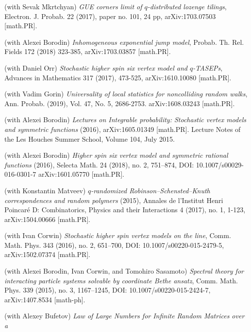 \documentclass[letterpaper,11pt]{article}
\begin{document}
\begin{etaremune}
	\item
	      (with Sevak Mkrtchyan)
	      \emph{GUE corners limit of $q$-distributed lozenge tilings},
				Electron. J. Probab. 22 (2017), paper no. 101, 24 pp,
				arXiv:1703.07503 [math.PR].
	\item
	      (with Alexei Borodin)
	      \emph{Inhomogeneous exponential jump model},
				Probab. Th. Rel. Fields
				172 (2018) 323-385,
				arXiv:1703.03857 [math.PR].
	\item
	      (with Daniel Orr)
	      \emph{Stochastic higher spin six vertex model and $q$-TASEPs},
	      Advances in Mathematics 317 (2017), 473-525, arXiv:1610.10080
	      [math.PR].
			\item
	      (with Vadim Gorin)
	      \emph{Universality of local statistics for noncolliding random
			  walks},
			  Ann. Probab. (2019), Vol. 47, No. 5, 2686-2753.
				arXiv:1608.03243 [math.PR].
	\item
	      (with Alexei Borodin)
	      \emph{Lectures on Integrable probability: Stochastic vertex
		      models and symmetric functions}
	      (2016), arXiv:1605.01349 [math.PR]. Lecture Notes of the Les
	      Houches Summer School, Volume 104, July 2015.
	\item
	      (with Alexei Borodin)
	      \emph{Higher spin six vertex model and symmetric rational
		      functions}
	      (2016),
				Selecta Math. 24 (2018), no. 2, 751--874, DOI: 10.1007/s00029-016-0301-7
	      arXiv:1601.05770 [math.PR].
	\item
	      (with Konstantin Matveev)
	      \emph{$q$-randomized Robinson--Schensted--Knuth correspondences
		      and random polymers}
	      (2015),
	      Annales de l'Institut Henri Poincar\'e D: Combinatorics, Physics
	      and their Interactions 4 (2017), no. 1, 1-123, arXiv:1504.00666 [math.PR].
	\item
	      (with Ivan Corwin)
	      \emph{Stochastic higher spin vertex models on the line},
	      Comm. Math. Phys. 343 (2016), no. 2, 651--700, DOI:
	      10.1007/s00220-015-2479-5, arXiv:1502.07374 [math.PR].
	\item
	      (with Alexei Borodin, Ivan Corwin, and Tomohiro Sasamoto)
	      \emph{Spectral theory for interacting particle systems solvable
		      by coordinate Bethe ansatz},
	      Comm. Math. Phys. 339 (2015), no. 3, 1167--1245, DOI:
	      10.1007/s00220-015-2424-7, arXiv:1407.8534 [math-ph].
	\item
	      (with Alexey Bufetov)
	      \emph{Law of Large Numbers for Infinite Random Matrices over a
}
\end{etaremune}
\end{document}
